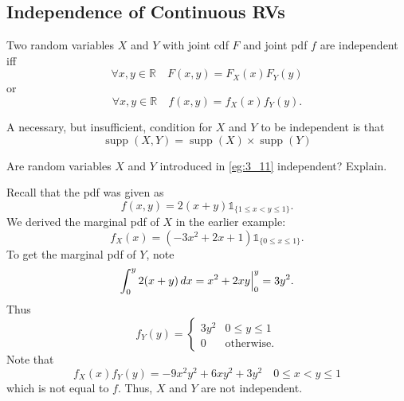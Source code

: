 \documentclass[notoc,notitlepage]{tufte-book}
\DeclareMathOperator{\supp}{supp }
\begin{document}

\subsection{Independence of Continuous RVs}%
\label{sub:independence_of_continuous_rvs}

\begin{defn}
\label{defn:independence_of_continuous_rvs}
  Two random variables $X$ and $Y$ with joint cdf $F$ and joint pdf $f$ are independent iff
  \begin{equation*}
    \forall x, y \in \mathbb{R} \quad F(x, y) = F_X(x) F_Y(y)
  \end{equation*}
  or
  \begin{equation*}
    \forall x, y \in \mathbb{R} \quad f(x, y) = f_X(x) f_Y(y).
  \end{equation*}
\end{defn}

\begin{note}
  A necessary, but insufficient, condition for $X$ and $Y$ to be independent is that
  \begin{equation*}
    \supp(X, Y) = \supp(X) \times \supp(Y)
  \end{equation*}
\end{note}

\begin{eg}[Example 3.12]
  Are random variables $X$ and $Y$ introduced in \cref{eg:3_11} independent? Explain.

  \begin{solution}
    Recall that the pdf was given as
    \begin{equation*}
      f(x, y) = 2(x + y) \mathbb{1}_{\{1 \leq x < y \leq 1\}}.
    \end{equation*}
    We derived the marginal pdf of $X$ in the earlier example:
    \begin{equation*}
      f_X (x) = (-3x^2 + 2x + 1) \mathbb{1}_{\{0 \leq x \leq 1\}}.
    \end{equation*}
    To get the marginal pdf of $Y$, note
    \begin{equation*}
      \int_{0}^{y} 2(x + y) \mathop{}\!d{x} = x^2 + 2xy \Big|_{0}^{y} = 3y^2.
    \end{equation*}
    Thus
    \begin{equation*}
      f_Y(y) = \begin{cases}
        3y^2 & 0 \leq y \leq 1 \\
        0 & \text{otherwise.}
      \end{cases}
    \end{equation*}
    Note that
    \begin{equation*}
      f_X(x) f_Y(y) = -9x^2y^2 + 6xy^2 + 3y^2 \quad 0 \leq x < y \leq 1
    \end{equation*}
    which is not equal to $f$. Thus, $X$ and $Y$ are not independent.
  \end{solution}
\end{eg}
\end{document}

